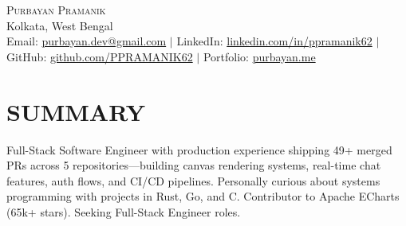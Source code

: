 \documentclass[letterpaper, 10pt]{article}
\begin{document}

  \begin{center}
    {\Huge \scshape Purbayan Pramanik} \\
    \vspace{1pt}
    Kolkata, West Bengal \\
    \vspace{1pt}
    \footnotesize Email: \href{mailto:purbayan.dev@gmail.com}{purbayan.dev@gmail.com} $|$ LinkedIn: \href{https://linkedin.com/in/ppramanik62}{linkedin.com/in/ppramanik62} $|$ GitHub: \href{https://github.com/PPRAMANIK62}{github.com/PPRAMANIK62} $|$ Portfolio: \href{https://purbayan.me}{purbayan.me}
  \end{center}
  \vspace{-2pt}

  \section{SUMMARY}
  \vspace{-1pt}
  \small{Full-Stack Software Engineer with production experience shipping 49+ merged PRs across 5 repositories---building canvas rendering systems, real-time chat features, auth flows, and CI/CD pipelines. Personally curious about systems programming with projects in Rust, Go, and C. Contributor to Apache ECharts (65k+ stars). Seeking Full-Stack Engineer roles.}
  \vspace{-8pt}

\end{document}
